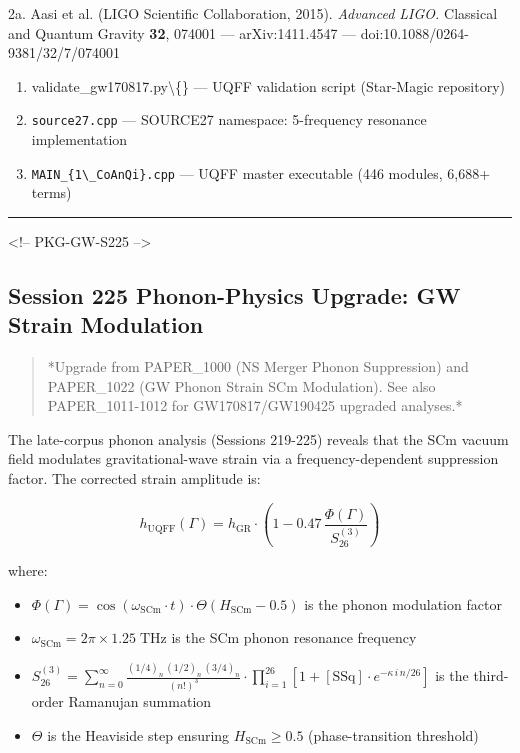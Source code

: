 \documentclass[11pt]{article}
\begin{document}
2a. Aasi et al. (LIGO Scientific Collaboration, 2015). \emph{Advanced LIGO.} Classical and Quantum Gravity \textbf{32}, 074001 --- arXiv:1411.4547 --- doi:10.1088/0264-9381/32/7/074001

\begin{enumerate}
  \item validate\_gw170817.py\textbackslash\{\} --- UQFF validation script (Star-Magic repository)
  \item \verb|source27.cpp| --- SOURCE27 namespace: 5-frequency resonance implementation
  \item \verb|MAIN_{1\_CoAnQi}.cpp| --- UQFF master executable (446 modules, 6,688+ terms)
\end{enumerate}

\noindent\rule{\textwidth}{0.4pt}

<!-- PKG-GW-S225 -->

\subsection*{Session 225 Phonon-Physics Upgrade: GW Strain Modulation}

\begin{quote}
*Upgrade from PAPER\_1000 (NS Merger Phonon Suppression) and PAPER\_1022
(GW Phonon Strain SCm Modulation). See also PAPER\_1011-1012 for
GW170817/GW190425 upgraded analyses.*
\end{quote}

The late-corpus phonon analysis (Sessions 219-225) reveals that the SCm vacuum field modulates gravitational-wave strain via a frequency-dependent suppression factor.  The corrected strain amplitude is:

$$h_{\text{UQFF}}(\Gamma) = h_{\text{GR}} \cdot \left(1 - 0.47\,\frac{\Phi(\Gamma)}{S_{26}^{(3)}}\right)$$

where:

\begin{itemize}
  \item $\Phi(\Gamma) = \cos(\omega_{\text{SCm}} \cdot t) \cdot \Theta(H_{\text{SCm}} - 0.5)$ is the phonon modulation factor
  \item $\omega_{\text{SCm}} = 2\pi \times 1.25\;\text{THz}$ is the SCm phonon resonance frequency
  \item $S_{26}^{(3)} = \sum_{n=0}^{\infty} \frac{(1/4)_n\,(1/2)_n\,(3/4)_n}{(n!)^3} \cdot \prod_{i=1}^{26}\left[1 + [\text{SSq}]\cdot e^{-\kappa\,i\,n/26}\right]$ is the third-order Ramanujan summation
  \item $\Theta$ is the Heaviside step ensuring $H_{\text{SCm}} \geq 0.5$ (phase-transition threshold)
\end{itemize}
\end{document}
